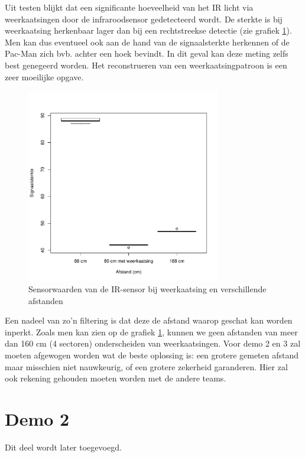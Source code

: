 \documentclass[12pt,a4paper]{report}
\begin{document}
Uit testen blijkt dat een significante hoeveelheid van het IR licht via weerkaatsingen door de infraroodsensor gedetecteerd wordt.
De sterkte is bij weerkaatsing herkenbaar lager dan bij een rechtstreekse detectie (zie grafiek \ref{fig:boxplotSpiegeling}).  Men kan dus eventueel ook aan de hand van de signaalsterkte herkennen of de Pac-Man zich bvb. achter een hoek bevindt. In dit geval kan deze meting zelfs best genegeerd worden. Het reconstrueren van een weerkaatsingpatroon is een zeer moeilijke opgave.

\begin{figure}
\begin{center}
 \includegraphics[width=85mm]{./resources/boxplotSpiegeling.pdf}
 \caption{Sensorwaarden van de IR-sensor bij weerkaatsing en verschillende afstanden}
 \label{fig:boxplotSpiegeling}
\end{center}
\end{figure}

Een nadeel van zo'n filtering is dat deze de afstand waarop geschat kan worden inperkt. Zoals men kan zien op de grafiek \ref{fig:boxplotSpiegeling}, kunnen we geen afstanden van meer dan 160 cm (4 sectoren) onderscheiden van weerkaatsingen. Voor demo 2 en 3 zal moeten afgewogen worden wat de beste oplossing is: een grotere gemeten afstand maar misschien niet nauwkeurig, of een grotere zekerheid garanderen. Hier zal ook rekening gehouden moeten worden met de andere teams. 

\section{Demo 2}

Dit deel wordt later toegevoegd.
\end{document}
